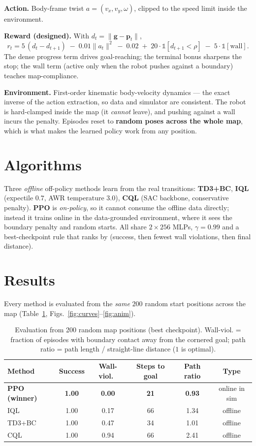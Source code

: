 \documentclass[11pt]{article}
\begin{document}
\textbf{Action.} Body-frame twist $a=(v_x,v_y,\omega)$, clipped to the speed
limit inside the environment.

\textbf{Reward (designed).} With $d_t=\lVert\mathbf g-\mathbf p_t\rVert$,
\begin{equation}
r_t = 5\,(d_t-d_{t+1}) \;-\; 0.01\lVert a_t\rVert^2 \;-\; 0.02
      \;+\; 20\cdot\mathbb 1[d_{t+1}<\rho] \;-\; 5\cdot\mathbb 1[\text{wall}].
\end{equation}
The dense progress term drives goal-reaching; the terminal bonus sharpens the
stop; the wall term (active only when the robot pushes against a boundary)
teaches map-compliance.

\textbf{Environment.} First-order kinematic body-velocity dynamics --- the exact
inverse of the action extraction, so data and simulator are consistent. The
robot is hard-clamped inside the map (it \emph{cannot} leave), and pushing
against a wall incurs the penalty. Episodes reset to \textbf{random poses across
the whole map}, which is what makes the learned policy work from any position.

\section{Algorithms}
Three \emph{offline} off-policy methods learn from the real transitions:
\textbf{TD3+BC}, \textbf{IQL} (expectile $0.7$, AWR temperature $3.0$),
\textbf{CQL} (SAC backbone, conservative penalty). \textbf{PPO} is
\emph{on-policy}, so it cannot consume the offline data directly; instead it
trains online in the data-grounded environment, where it sees the boundary
penalty and random starts. All share $2{\times}256$ MLPs, $\gamma=0.99$ and a
best-checkpoint rule that ranks by (success, then fewest wall violations, then
final distance).

\section{Results}
Every method is evaluated from the \emph{same} $200$ random start positions
across the map (Table~\ref{tab:res}, Figs.~\ref{fig:curves}--\ref{fig:anim}).

\begin{table}[h]
\centering
\caption{Evaluation from 200 random map positions (best checkpoint). Wall-viol.
= fraction of episodes with boundary contact away from the cornered goal; path
ratio = path length / straight-line distance ($1$ is optimal).}
\label{tab:res}
\begin{tabular}{lccccc}
\toprule
Method & Success & Wall-viol.\ & Steps to goal & Path ratio & Type\\
\midrule
\textbf{PPO (winner)} & \textbf{1.00} & \textbf{0.00} & \textbf{21} & \textbf{0.93} & online in sim\\
IQL   & 1.00 & 0.17 & 66 & 1.34 & offline\\
TD3+BC & 1.00 & 0.47 & 34 & 1.01 & offline\\
CQL   & 1.00 & 0.94 & 66 & 2.41 & offline\\
\bottomrule
\end{tabular}
\end{table}
\end{document}

